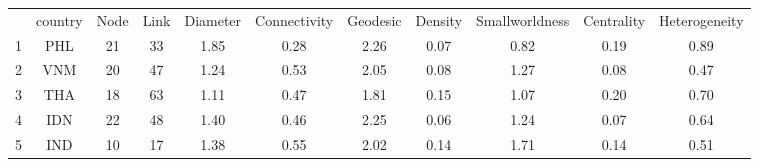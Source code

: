 \begin{table} 
    \begin{tabular}{ c c c c c c c c c c c }
    \hline
         & country & Node & Link & Diameter & Connectivity & Geodesic & Density & Smallworldness & Centrality & Heterogeneity \\ 
        1 & PHL & 21 & 33 & 1.85 & 0.28 & 2.26 & 0.07 & 0.82 & 0.19 & 0.89 \\ 
        2 & VNM & 20 & 47 & 1.24 & 0.53 & 2.05 & 0.08 & 1.27 & 0.08 & 0.47 \\ 
        3 & THA & 18 & 63 & 1.11 & 0.47 & 1.81 & 0.15 & 1.07 & 0.20 & 0.70 \\ 
        4 & IDN & 22 & 48 & 1.40 & 0.46 & 2.25 & 0.06 & 1.24 & 0.07 & 0.64 \\ 
        5 & IND & 10 & 17 & 1.38 & 0.55 & 2.02 & 0.14 & 1.71 & 0.14 & 0.51 \\ 
     \hline  
    \end{tabular} 
\end{table}